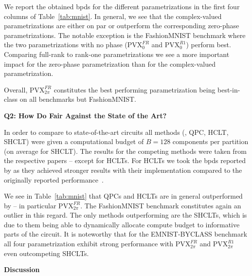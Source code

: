 We report the obtained bpds for the different \pvc parametrizations in the first four columns of Table~\ref{tab:mnist}. In general, we see that the complex-valued parametrizations are either on par or outperform the corresponding zero-phase parametrizations.
The notable exception is the FashionMNIST benchmark where the two parametrizations with no phase ($\mathrm{PVX}_{0}^{FR}$ and $\mathrm{PVX}_{0}^{R1}$) perform best.
Comparing full-rank to rank-one parametrizations we see a more important impact for the zero-phase parametrization than for the complex-valued parametrization.


Overall, $\mathrm{PVX}_{2\pi}^{FR}$ constitutes the best performing parametrization being best-in-class on all benchmarks but FashionMNIST.











\textbf{Q2: How Do \pvcs Fair Against the State of the Art?}

In order to compare \pvcs to state-of-the-art circuits all methods (\pvc, QPC, HCLT, SHCLT) were given a computational budget of $B=128$ components per partition (on average for SHCLT).
The results for the competing methods were taken from the respective papers -- except for HCLTs. For HCLTs we took the bpds reported by \citet{gala2024probabilistic} as they achieved stronger results with their implementation compared to the originally reported performance~\citep{liu2021tractable}.

We see in Table~\ref{tab:mnist} that QPCs and HCLTs are in general outperformed by \pvc -- in particular $\mathrm{PVX}_{2\pi}^{FR}$. The FashionMNIST benchmark constitutes again an outlier in this regard.
The only methods outperforming \pvcs are the SHCLTs, which is due to them being able to dynamically allocate compute budget to informative parts of the circuit.
It is noteworthy that for the EMNIST-BYCLASS benchmark all four  \pvc parametrization exhibit strong performance with  $\mathrm{PVX}_{2\pi}^{FR}$ and $\mathrm{PVX}_{2\pi}^{R1}$ even outcompeting SHCLTs.


\textbf{Discussion}

